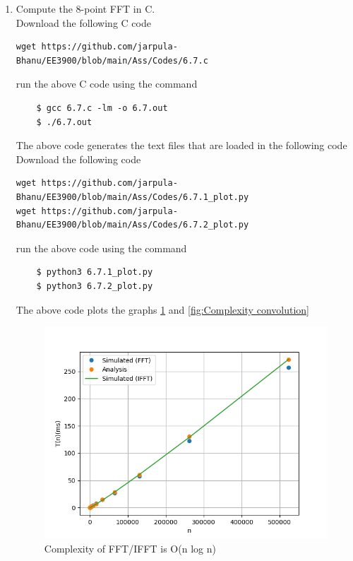 \documentclass[journal,12pt,twocolumn]{IEEEtran}
\renewcommand\thesection{\arabic{section}}
\begin{document}
\begin{enumerate}[label=\thesection.\arabic*
,ref=\thesection.\theenumi]
\item Compute the 8-point FFT in C.\\
\solution Download the following C code 
\begin{lstlisting}
wget https://github.com/jarpula-Bhanu/EE3900/blob/main/Ass/Codes/6.7.c
\end{lstlisting}
run the above C code using the command
\begin{lstlisting}
	$ gcc 6.7.c -lm -o 6.7.out
	$ ./6.7.out
\end{lstlisting}
The above code generates the text files that are loaded in the following code \\
Download the following code 
\begin{lstlisting}
wget https://github.com/jarpula-Bhanu/EE3900/blob/main/Ass/Codes/6.7.1_plot.py
wget https://github.com/jarpula-Bhanu/EE3900/blob/main/Ass/Codes/6.7.2_plot.py
\end{lstlisting}
run the above code using the command
\begin{lstlisting}
	$ python3 6.7.1_plot.py
	$ python3 6.7.2_plot.py
\end{lstlisting}
The above code plots the graphs \ref{fig:complexity fft/ifft} and \ref{fig:Complexity convolution}
\begin{figure}
\centering
\includegraphics[width=\columnwidth]{figs/6.7.1_plot.png}
\caption{Complexity of FFT/IFFT is O(n log n)}
\label{fig:complexity fft/ifft}
\end{figure}


\end{enumerate}
\end{document}
